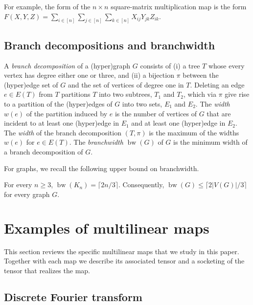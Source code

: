 \documentclass{toc}
\DeclareMathOperator{\bw}{bw}
\begin{document}
For example, the form of the $n \times n$ square-matrix multiplication
map is the form $F(X, Y, Z) = \sum_{i \in [n]} \sum_{j \in [n]}
\sum_{k \in [n]} X_{ij}Y_{jk}Z_{ik}$.

\subsection{Branch decompositions and branchwidth}

A \emph{branch decomposition} of a (hyper)graph $G$ consists of
(i) a tree $T$ whose every vertex has degree either one or three, and
(ii) a bijection $\pi$ between the (hyper)edge set of $G$ and the set of
vertices of degree one in $T$. Deleting an edge $e\in E(T)$ from $T$
partitions $T$ into two subtrees, %
 $T_1$ and $T_2$, which via $\pi$
%
give rise  %
to a partition of the (hyper)edges of $G$ into
two sets,  %
$E_1$ and $E_2$.
The \emph{width} $w(e)$
of the partition induced by $e$ is the number of vertices of $G$ that are
incident to at least one (hyper)edge in $E_1$ and at least one (hyper)edge
in $E_2$. The \emph{width} of the branch decomposition $(T,\pi)$ is the maximum
of the widths $w(e)$ for $e\in E(T)$. The \emph{branchwidth} $\bw(G)$ of $G$
is the minimum width of a branch decomposition of $G$.

For graphs, we recall the following upper bound on branchwidth.

\begin{claim}
  For every $n \ge 3$, $\bw(K_n) = \lceil 2n/3 \rceil$.  Consequently, $\bw(G) \le \lceil 2 |V(G)|/3 \rceil$ for every graph $G$.
\end{claim}






\section{Examples of multilinear maps}
\label{sect:examples}

This section reviews the specific multilinear maps that we study in this
%
paper.  %
Together with each map we describe its associated
tensor and a socketing of the tensor that realizes the map.

\subsection{Discrete Fourier transform}

\label{sect:dft}
\end{document}
